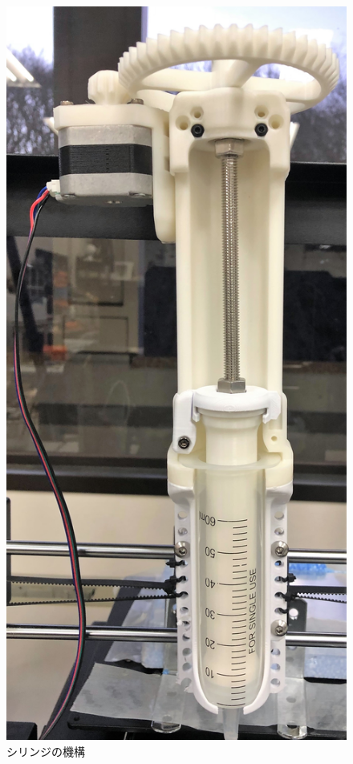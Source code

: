 \begin{figure}[H]
  \centering
  \includegraphics[width=8truecm]{./fig/101285897.jpg}
  \caption{シリンジの機構}
  \label{fig:printer2}
\end{figure}

